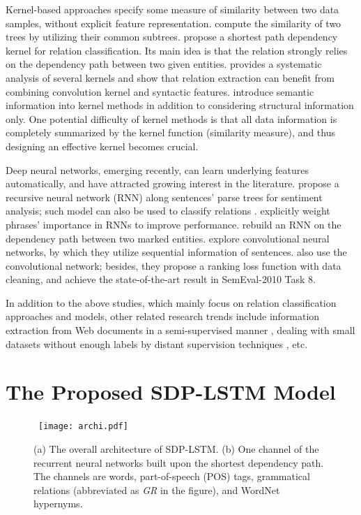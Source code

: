 \documentclass[11pt,a4paper]{article}
\begin{document}
Kernel-based approaches specify some measure of similarity between two data samples, without explicit feature representation.
 compute the similarity of two trees by utilizing their common subtrees.
 propose a shortest path dependency kernel for relation classification. Its main idea is that the relation strongly relies on the dependency path between two given entities.  provides a systematic analysis of several kernels 
and show that relation extraction can benefit from combining convolution kernel and syntactic features.
 introduce semantic information into kernel methods 
in addition to considering structural information only.
One potential difficulty of kernel methods is that
all data information is completely summarized by the kernel function (similarity measure),
and thus designing an effective kernel becomes crucial.

Deep neural networks, emerging recently, can learn underlying features automatically,
and have attracted growing interest in the literature.
 propose a recursive neural network (RNN) along sentences' parse trees
for sentiment analysis;
such model can also be used to classify relations \cite{MVRNN}.
 explicitly weight phrases' importance in RNNs to improve performance.
 rebuild an RNN on the dependency path between two marked entities.
 explore convolutional neural networks,
by which they utilize sequential information of sentences.
 also use the convolutional network; besides, they propose a ranking loss function with data cleaning, and achieve the state-of-the-art result in SemEval-2010 Task 8.

In addition to the above studies,
which mainly focus on relation classification approaches and models,
other related research trends include information extraction from Web documents in a semi-supervised manner
\cite{MiniSupRE,OIE-1}, dealing with small datasets without enough labels
by distant supervision techniques
\cite{DisSupRE}, etc.


\section{The Proposed SDP-LSTM Model}\label{sModel}
\begin{figure*}
\ \texttt{[image: archi.pdf]}
\caption{(a) The overall architecture of SDP-LSTM.
(b) One channel of the recurrent neural networks built upon the shortest dependency path.
The channels are words, part-of-speech (POS) tags, grammatical relations
(abbreviated as \textit{GR} in the figure),
and WordNet hypernyms.
}\label{fArchitecture}
\end{figure*}
\end{document}

